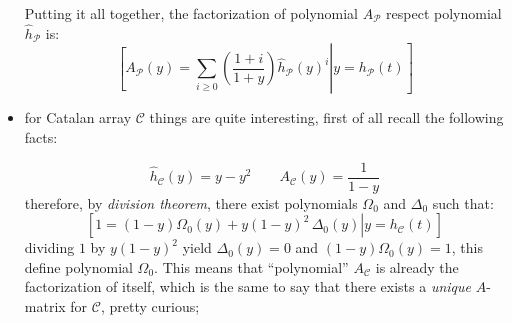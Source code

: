 \begin{itemize}
        Putting it all together, the factorization of polynomial 
        $A_{\mathcal{P}}$ respect polynomial $\hat{h}_{\mathcal{P}}$ is:
        \begin{displaymath}
                \left.\left[
                    A_{\mathcal{P}}(y) = \sum_{i \geq0}{\left(\frac{1+i}{1+y}\right)
                        \hat{h}_{\mathcal{P}}(y)^{i}} \right| y = h_{\mathcal{P}}(t) \right]
        \end{displaymath}

    \item for Catalan array $\mathcal{C}$ things are quite interesting,
        first of all recall the following facts:

        \begin{displaymath} 
            \hat{h}_{\mathcal{C}}(y)=y-y^2 \quad\quad 
                A_{\mathcal{C}}(y)=\frac{1}{1-y}
        \end{displaymath} 
        therefore, by \emph{division theorem}, 
        there exist polynomials $\Omega_{0}$ and $\Delta_{0}$ such that:
        \begin{displaymath}
            \left.\left[
                1 = (1-y)\Omega_{0}(y) + y(1-y)^{2}\,\Delta_{0}(y) 
                    \right| y = h_{\mathcal{C}}(t) \right]
        \end{displaymath}
        dividing $1$ by $y(1-y)^2$ yield $\Delta_{0}(y)=0$ 
        and $(1-y)\Omega_{0}(y)=1$, this define polynomial $\Omega_{0}$. 
        This means that ``polynomial'' $A_{\mathcal{C}}$ is already
        the factorization of itself, which is the same to say that
        there exists a \emph{unique} $A$-matrix for $\mathcal{C}$, pretty curious;


\end{itemize}
